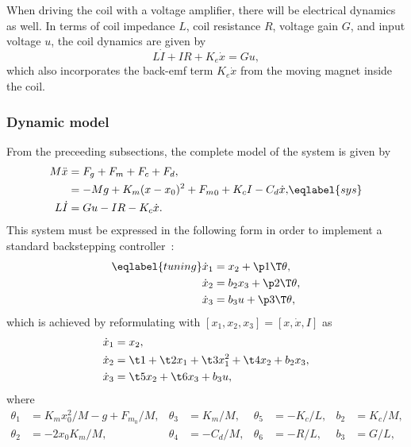 When driving the coil with a voltage amplifier, there will be
electrical dynamics as well. In terms of coil impedance $L$, coil
resistance $R$, voltage gain $G$, and input voltage $u$, the coil
dynamics are given by
\begin{equation}
  L\dot I + IR + K_e\dot x = Gu,
\end{equation}
which also incorporates the back-emf term $K_e\dot x$ from the moving magnet
inside the coil.

\subsubsection{Dynamic model}

From the preceeding subsections, the complete model of the system is given by
\begin{align}
\begin{split}
M\ddot x & = F_g+F_m+F_c+F_d,\\
         & = -Mg + K_m(x-x_0)^2 + {F_m}_0 + K_cI - C_d\dot x,\\
L\dot I  & = Gu - IR - K_c\dot x.
\end{split}\eqlabel{sys}
\end{align}
This system must be expressed in the following form in order to implement a
standard backstepping controller~\cite{krstic1995}:
\begin{align}
\begin{split}
\eqlabel{tuning}
  \dot x_1 &= x_2 + \p1\T\theta,\\
  \dot x_2 &= b_2x_3 + \p2\T\theta,\\
  \dot x_3 &= b_3u + \p3\T\theta,
\end{split}
\end{align}
which is achieved by reformulating  with $[x_1, x_2, x_3] =
[x, \dot x, I]$ as
\begin{align}
\begin{split}
  \dot x_1 &= x_2 ,\\
  \dot x_2 &= \t1 + \t2 x_1 + \t3x_1^2 + \t4x_2 + b_2x_3 ,\\
  \dot x_3 &= \t5x_2 + \t6x_3 + b_3u ,
\end{split}
\end{align}
where
\begingroup
\def\frac#1#2{#1/#2}
\begin{equation}
\begin{aligned}
\theta_1&=\frac{K_m x_0^2}{M}-g+\frac{F_{m_0}}{M},&
\theta_3&=\frac{K_m}{M},&
\theta_5&=-\frac{K_c}{L},&
b_2&=\frac{K_c}{M},\\
\theta_2&=-\frac{2 x_0 K_m}{M},&
\theta_4&=-\frac{C_d}{M},&
\theta_6&=-\frac{R}{L},&
b_3&=\frac{G}{L},
\end{aligned}
\end{equation}
